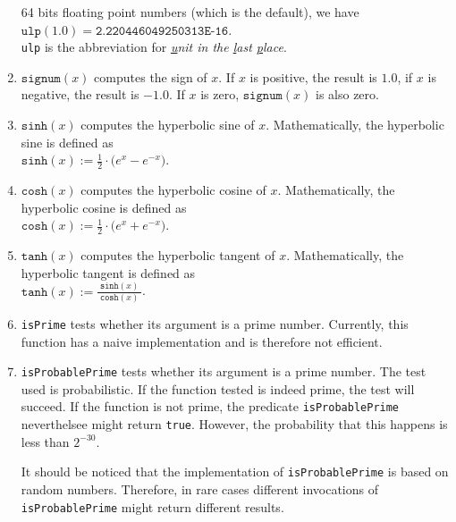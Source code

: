 \begin{enumerate}
      64 bits floating point numbers (which is the default), we have
      \\[0.2cm]
      \hspace*{1.3cm}
      $\mathtt{ulp}(1.0) = \texttt{2.220446049250313E-16}$.
      \\[0.2cm]
      \texttt{ulp} is the abbreviation for 
      \emph{\underline{u}nit in the \underline{l}ast \underline{p}lace}. 
\item $\mathtt{signum}(x)$ computes the sign of $x$.  If $x$ is positive, the result is
      $1.0$, if $x$ is negative, the result is $-1.0$.  If $x$ is zero,
      $\mathtt{signum}(x)$ is also zero.
\item $\texttt{sinh}(x)$ computes the hyperbolic sine of $x$.  Mathematically, the
      hyperbolic sine is defined as 
      \\[0.2cm]
      \hspace*{1.3cm}
      $\mathtt{sinh}(x) := \frac{1}{2} \cdot \bigl(e^x - e^{-x}\bigr)$.
\item $\texttt{cosh}(x)$ computes the hyperbolic cosine of $x$.  Mathematically, the
      hyperbolic cosine is defined as 
      \\[0.2cm]
      \hspace*{1.3cm}
      $\mathtt{cosh}(x) := \frac{1}{2} \cdot \bigl(e^x + e^{-x}\bigr)$.
\item $\texttt{tanh}(x)$ computes the hyperbolic tangent of $x$.  Mathematically, the
      hyperbolic tangent is defined as 
      \\[0.2cm]
      \hspace*{1.3cm}
      $\mathtt{tanh}(x) := \displaystyle \frac{\;\mathtt{sinh}(x)\;}{\mathtt{cosh}(x)}$.
\item \texttt{isPrime} tests whether its argument is a prime number.  Currently, 
      this function has a naive implementation and is therefore not efficient.
\item \texttt{isProbablePrime} tests whether its argument is a prime number.  The test
      used is probabilistic.  If the function tested is indeed  prime, the test 
      will succeed.  If the function is not prime, the predicate \texttt{isProbablePrime}
      neverthelsee might return \texttt{true}.  However, the probability that this happens
      is less than $2^{-30}$.

      It should be noticed that the implementation of \texttt{isProbablePrime} is
      based on random numbers.  Therefore, in rare cases different invocations of
      \texttt{isProbablePrime} might return different results.  
\end{enumerate}


